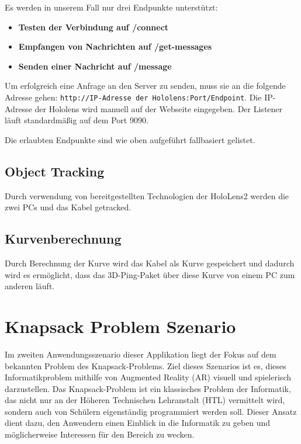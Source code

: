Es werden in unserem Fall nur drei Endpunkte unterstützt:

\begin{itemize}
    \item \textbf{Testen der Verbindung auf /connect}
    \item \textbf{Empfangen von Nachrichten auf /get-messages}
    \item \textbf{Senden einer Nachricht auf /message}
\end{itemize}

Um erfolgreich eine Anfrage an den Server zu senden, muss sie an die folgende Adresse
gehen: \texttt{http://{IP-Adresse der Hololens}:{Port}/{Endpoint}}. Die IP-Adresse der Hololens wird manuell auf der
Webseite eingegeben. Der Listener läuft standardmäßig auf dem Port 9090.

Die erlaubten Endpunkte sind wie oben aufgeführt fallbasiert gelistet.

\subsection{Object Tracking} 
Durch verwendung von bereitgestellten Technologien der HoloLens2
werden die zwei PCs und das Kabel getracked.

\subsection{Kurvenberechnung}
Durch Berechnung der Kurve wird das Kabel als Kurve gespeichert
und dadurch wird es ermöglicht, dass das 3D-Ping-Paket über diese
Kurve von einem PC zum anderen läuft.

\section{Knapsack Problem Szenario} 
Im zweiten Anwendungsszenario dieser Applikation liegt der Fokus auf dem bekannten Problem des Knapsack-Problems. Ziel
dieses Szenarios ist es, dieses Informatikproblem mithilfe von Augmented Reality (AR) visuell und spielerisch darzustellen.
Das Knapsack-Problem ist ein klassisches Problem der Informatik, das nicht nur an der Höheren Technischen Lehranstalt (HTL)
vermittelt wird, sondern auch von Schülern eigenständig programmiert werden soll. Dieser Ansatz dient dazu, den Anwendern
einen Einblick in die Informatik zu geben und möglicherweise Interessen für den Bereich zu wecken.

